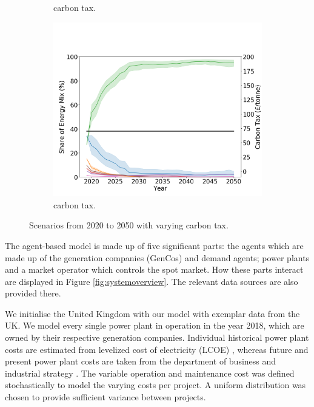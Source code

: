 \begin{figure}[h]
\begin{subfigure}[b]{0.6\textwidth}
		\caption[]%
		{ carbon tax.}
		\label{fig:demand99carbon20}
	\end{subfigure}
	\begin{subfigure}[b]{0.6\textwidth}
		\centering
		\includegraphics[width=\textwidth]{Chapter4/figures/scenarios/demand099-carbon70-datetime.png}
		\caption[Network2]%
		{\small {} carbon tax.}
		\label{fig:demand99carbon70}
	\end{subfigure}
	\caption{Scenarios from 2020 to 2050 with varying carbon tax.}
\end{figure}


The agent-based model is made up of five significant parts: the agents which are made up of the generation companies (GenCos) and demand agents; power plants and a market operator which controls the spot market. How these parts interact are displayed in Figure \ref{fig:systemoverview}. The relevant data sources are also provided there.

We initialise the United Kingdom with our model with exemplar data from the UK. We model every single power plant in operation in the year 2018, which are owned by their respective generation companies. Individual historical power plant costs are estimated from levelized cost of electricity (LCOE) \cite{Dale2013, IEA2015,IRENA2018}, whereas future and present power plant costs are taken from the department of business and industrial strategy \cite{Department2016}. The variable operation and maintenance cost was defined stochastically to model the varying costs per project. A uniform distribution was chosen to provide sufficient variance between projects.

